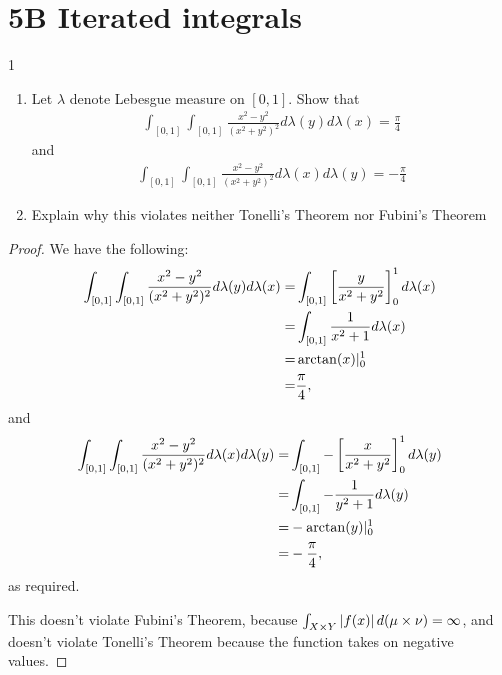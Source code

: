 \section{5B Iterated integrals}


\begin{exercise}{1}
\begin{enumerate}
    \item Let $\lambda$ denote Lebesgue measure on $[0,1]$.
    Show that 
    \begin{align*}
        \int_{[0,1]} \int_{[0,1]} \frac{x^2 - y^2}{(x^2 + y^2)^2} d\lambda(y) d\lambda(x)
            = \frac{\pi}{4}
    \end{align*}
    and
    \begin{align*}
        \int_{[0,1]} \int_{[0,1]} \frac{x^2 - y^2}{(x^2 + y^2)^2} d\lambda(x) d\lambda(y)
            = -\frac{\pi}{4}
    \end{align*}
    \item Explain why this violates neither Tonelli's Theorem nor Fubini's Theorem
\end{enumerate}
\end{exercise}
\begin{proof}
We have the following:
\begin{align*}
    \int_{[0,1]} \int_{[0,1]} \frac{x^2 - y^2}{(x^2 + y^2)^2} d\lambda(y) d\lambda(x)
    =& \int_{[0,1]}  \left[ \frac{y}{x^2 + y^2}\right]^1_0  d\lambda(x)\\
    =& \int_{[0,1]} \frac{1}{x^2 + 1} d\lambda(x)\\
    =& \arctan(x)\lvert^1_0\\
    =& \frac{\pi}{4},
\end{align*}
and
\begin{align*}
    \int_{[0,1]} \int_{[0,1]} \frac{x^2 - y^2}{(x^2 + y^2)^2} d\lambda(x) d\lambda(y)
    =& \int_{[0,1]}  -\left[ \frac{x}{x^2 + y^2}\right]^1_0  d\lambda(y)\\
    =& \int_{[0,1]} -\frac{1}{y^2 + 1} d\lambda(y)\\
    =& -\arctan(y)\lvert^1_0\\
    =& -\frac{\pi}{4},
\end{align*}
as required.

This doesn't violate Fubini's Theorem, because $\int_{X \times Y} \left\lvert f(x)\right\rvert d(\mu \times \nu) = \infty$, and doesn't violate Tonelli's Theorem because the function takes on negative values.
\end{proof} 

